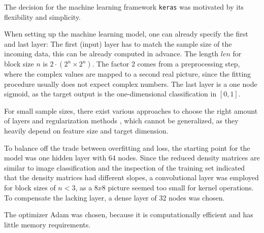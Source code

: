\documentclass[reprint,amsmath,amssymb,aps,prb]{revtex4-2}
\begin{document}
The decision for the machine learning framework \texttt{keras} was motivated by its flexibility and simplicity. \cite{chollet2015keras}

When setting up the machine learning model, one can already specify the first and last layer: The first (input) layer has to match the sample size of the incoming data, this can be already computed in advance. The length $len$ for block size $n$ is $2\cdot\left(2^n\times 2^n \right)$. The factor 2 comes from a preprocessing step, where the complex values are mapped to a second real picture, since the fitting procedure usually does not expect complex numbers. The last layer is a one node sigmoid, as the target output is the one-dimensional classification in $\left[0,1\right]$.

For small sample sizes, there exist various approaches to choose the right amount of layers and regularization methods \cite{Olson2018,Feng2019}, which cannot be generalized, as they heavily depend on feature size and target dimension. 

To balance off the trade between overfitting and loss, the starting point for the model was one hidden layer with 64 nodes. Since the reduced density matrices are similar to image classification and the inspection of the training set indicated that the density matrices had different slopes, a convolutional layer was employed for block sizes of $n<3$, as a $8x8$ picture seemed too small for kernel operations. To compensate the lacking layer, a dense layer of 32 nodes was chosen.

The optimizer Adam was chosen, because it is computationally efficient and
has little memory requirements. \cite{Kingma2014}
\end{document}

